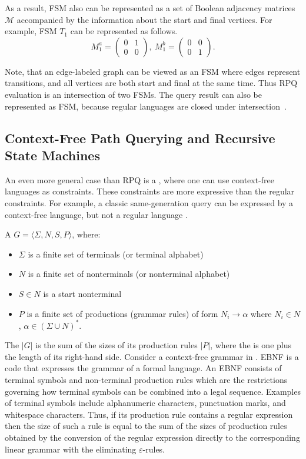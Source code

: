 As a result, FSM also can be represented as a set of Boolean adjacency matrices $\mathcal{M}$ accompanied by the information about the start and final vertices.
For example, FSM $T_1$ can be represented as follows.
$$
M_1^a =
\begin{pmatrix}
0&1 \\
0&0
\end{pmatrix},~
M_1^b =
\begin{pmatrix}
0&0 \\
0&1
\end{pmatrix}.
$$

Note, that an edge-labeled graph can be viewed as an FSM where edges represent transitions, and all vertices are both start and final at the same time.
Thus RPQ evaluation is an intersection of two FSMs.
The query result can also be represented as FSM, because regular languages are closed under intersection~\citep{automata:theory:10.5555/1177300}.

\subsection{Context-Free Path Querying and Recursive State Machines}

An even more general case than RPQ is a , where one can use context-free languages as constraints.
These constraints are more expressive than the regular constraints.
For example, a classic same-generation query can be expressed by a context-free language, but not a regular language \citep{databasebook}.

\begin{definition} 
A  $G = \langle\Sigma, N, S, P\rangle$, where:
\begin{itemize}
    \item $\Sigma$ is a finite set of terminals (or terminal alphabet)
    \item $N$ is a finite set of nonterminals (or nonterminal alphabet)
    \item $S \in N$ is a start nonterminal
    \item $P$ is a finite set of productions (grammar rules) of form $N_i \to \alpha$ where  $N_i \in N$, $\alpha \in (\Sigma \cup N)^*$.
\end{itemize} 
\end{definition}

The  $|G|$ is the sum of the sizes of its production rules $|P|$, where the  is one plus the length of its right-hand side. Consider a context-free grammar in . EBNF is a code that expresses the grammar of a formal language. An EBNF consists of terminal symbols and non-terminal production rules which are the restrictions governing how terminal symbols can be combined into a legal sequence. Examples of terminal symbols include alphanumeric characters, punctuation marks, and whitespace characters. Thus, if its production rule contains a regular expression then the size of such a rule is equal to the sum of the sizes of production rules obtained by the conversion of the regular expression directly to the corresponding linear grammar with the eliminating $\varepsilon$-rules.

